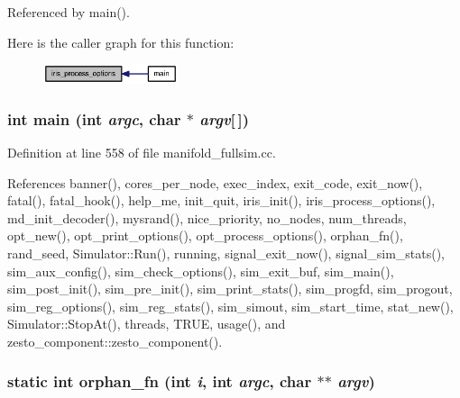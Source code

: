 Referenced by main().

Here is the caller graph for this function:\nopagebreak
\begin{figure}[H]
\begin{center}
\leavevmode
\includegraphics[width=112pt]{manifold__fullsim_8cc_d1d4500f982f63302d71d34a7d5381dd_icgraph}
\end{center}
\end{figure}
\subsubsection[{main}]{\setlength{\rightskip}{0pt plus 5cm}int main (int {\em argc}, \/  char $\ast$ {\em argv}[$\,$])}\label{manifold__fullsim_8cc_0ddf1224851353fc92bfbff6f499fa97}




Definition at line 558 of file manifold\_\-fullsim.cc.

References banner(), cores\_\-per\_\-node, exec\_\-index, exit\_\-code, exit\_\-now(), fatal(), fatal\_\-hook(), help\_\-me, init\_\-quit, iris\_\-init(), iris\_\-process\_\-options(), md\_\-init\_\-decoder(), mysrand(), nice\_\-priority, no\_\-nodes, num\_\-threads, opt\_\-new(), opt\_\-print\_\-options(), opt\_\-process\_\-options(), orphan\_\-fn(), rand\_\-seed, Simulator::Run(), running, signal\_\-exit\_\-now(), signal\_\-sim\_\-stats(), sim\_\-aux\_\-config(), sim\_\-check\_\-options(), sim\_\-exit\_\-buf, sim\_\-main(), sim\_\-post\_\-init(), sim\_\-pre\_\-init(), sim\_\-print\_\-stats(), sim\_\-progfd, sim\_\-progout, sim\_\-reg\_\-options(), sim\_\-reg\_\-stats(), sim\_\-simout, sim\_\-start\_\-time, stat\_\-new(), Simulator::StopAt(), threads, TRUE, usage(), and zesto\_\-component::zesto\_\-component().
\subsubsection[{orphan\_\-fn}]{\setlength{\rightskip}{0pt plus 5cm}static int orphan\_\-fn (int {\em i}, \/  int {\em argc}, \/  char $\ast$$\ast$ {\em argv})\hspace{0.3cm}{\tt  [static]}}\label{manifold__fullsim_8cc_83995bc1d7a29f4a3f671918e86f8eaa}




